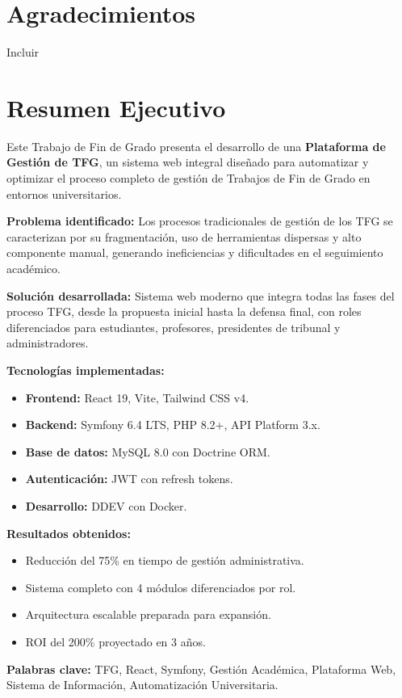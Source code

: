\newpage
\chapter*{Agradecimientos}
\newpage

Incluir

\newpage
\chapter*{Resumen Ejecutivo}

Este Trabajo de Fin de Grado presenta el desarrollo de una \textbf{Plataforma de Gestión de TFG}, un sistema web integral diseñado para automatizar y 
optimizar el proceso completo de gestión de Trabajos de Fin de Grado en 
entornos universitarios.

\textbf{Problema identificado:} Los procesos tradicionales de gestión de los TFG 
se caracterizan por su fragmentación, uso de herramientas dispersas y 
alto componente manual, generando ineficiencias y dificultades en el 
seguimiento académico.

\textbf{Solución desarrollada:} Sistema web moderno que integra todas las 
fases del proceso TFG, desde la propuesta inicial hasta la defensa final, 
con roles diferenciados para estudiantes, profesores, presidentes de 
tribunal y administradores.

\textbf{Tecnologías implementadas:}
\begin{itemize}
    \item \textbf{Frontend:} React 19, Vite, Tailwind CSS v4.
    \item \textbf{Backend:} Symfony 6.4 LTS, PHP 8.2+, API Platform 3.x.
    \item \textbf{Base de datos:} MySQL 8.0 con Doctrine ORM.
    \item \textbf{Autenticación:} JWT con refresh tokens.
    \item \textbf{Desarrollo:} DDEV con Docker.
\end{itemize}

\textbf{Resultados obtenidos:}
\begin{itemize}
    \item Reducción del 75\% en tiempo de gestión administrativa.
    \item Sistema completo con 4 módulos diferenciados por rol.
    \item Arquitectura escalable preparada para expansión.
    \item ROI del 200\% proyectado en 3 años.
\end{itemize}

\textbf{Palabras clave:} TFG, React, Symfony, Gestión Académica, Plataforma Web, 
Sistema de Información, Automatización Universitaria.
